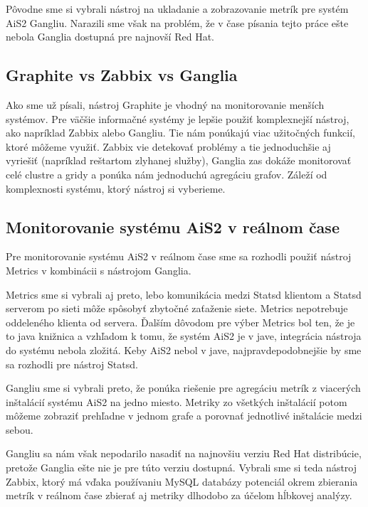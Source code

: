 \documentclass[a4paper, usesections, upjsfrontpage, thesismargins, thesislinespacing]{rnthesis}
\begin{document}
Pôvodne sme si vybrali nástroj na ukladanie a zobrazovanie metrík pre systém AiS2 Gangliu.
Narazili sme však na problém, že v čase písania tejto práce ešte nebola Ganglia dostupná pre najnovší Red Hat.


\subsection{Graphite vs Zabbix vs Ganglia}

Ako sme už písali, nástroj Graphite je vhodný na monitorovanie menších systémov.
Pre väčšie informačné systémy je lepšie použiť komplexnejší nástroj, ako napríklad Zabbix alebo Gangliu.
Tie nám ponúkajú viac užitočných funkcií, ktoré môžeme využiť.
Zabbix vie detekovať problémy a tie jednoduchšie aj vyriešiť (napríklad reštartom zlyhanej služby), 
	Ganglia zas dokáže monitorovať celé clustre a gridy a ponúka nám jednoduchú agregáciu grafov.
Záleží od komplexnosti systému, ktorý nástroj si vyberieme.

\subsection{Monitorovanie systému AiS2 v reálnom čase}

Pre monitorovanie systému AiS2 v reálnom čase sme sa rozhodli použiť nástroj Metrics v kombinácii s nástrojom Ganglia.

Metrics sme si vybrali aj preto, lebo komunikácia medzi Statsd klientom a Statsd serverom po sieti môže spôsobyť zbytočné zaťaženie siete.
Metrics nepotrebuje oddeleného klienta od servera.
Ďalším dôvodom pre výber Metrics bol ten, že je to java knižnica a vzhľadom k tomu, že systém AiS2 je v jave, integrácia nástroja do systému nebola zložitá.
Keby AiS2 nebol v jave, najpravdepodobnejšie by sme sa rozhodli pre nástroj Statsd.

Gangliu sme si vybrali preto, že ponúka riešenie pre agregáciu metrík z viacerých inštalácií systému AiS2 na jedno miesto.
Metriky zo všetkých inštalácií potom môžeme zobraziť prehľadne v jednom grafe a porovnať jednotlivé inštalácie medzi sebou.

Gangliu sa nám však nepodarilo nasadiť na najnovšiu verziu Red Hat distribúcie, pretože Ganglia ešte nie je pre túto verziu dostupná.
Vybrali sme si teda nástroj Zabbix, ktorý má vďaka používaniu MySQL databázy potenciál okrem zbierania metrík v reálnom čase zbierať aj metriky dlhodobo za účelom hĺbkovej analýzy. 
\end{document}

